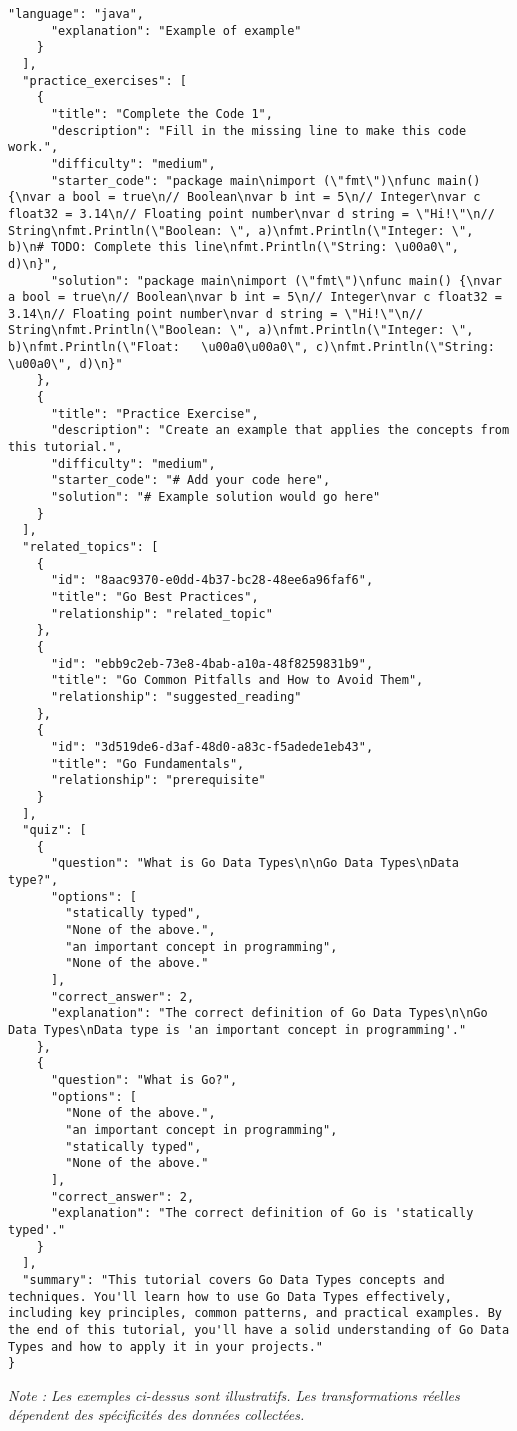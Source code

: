 \documentclass[12pt, a4paper]{article}
\begin{document}
\begin{lstlisting}[style=json, caption=Extrait de données après application du script de nettoyage, label=lst:json_after]
      "language": "java",
      "explanation": "Example of example"
    }
  ],
  "practice_exercises": [
    {
      "title": "Complete the Code 1",
      "description": "Fill in the missing line to make this code work.",
      "difficulty": "medium",
      "starter_code": "package main\nimport (\"fmt\")\nfunc main() {\nvar a bool = true\n// Boolean\nvar b int = 5\n// Integer\nvar c float32 = 3.14\n// Floating point number\nvar d string = \"Hi!\"\n// String\nfmt.Println(\"Boolean: \", a)\nfmt.Println(\"Integer: \", b)\n# TODO: Complete this line\nfmt.Println(\"String: \u00a0\", d)\n}",
      "solution": "package main\nimport (\"fmt\")\nfunc main() {\nvar a bool = true\n// Boolean\nvar b int = 5\n// Integer\nvar c float32 = 3.14\n// Floating point number\nvar d string = \"Hi!\"\n// String\nfmt.Println(\"Boolean: \", a)\nfmt.Println(\"Integer: \", b)\nfmt.Println(\"Float:   \u00a0\u00a0\", c)\nfmt.Println(\"String: \u00a0\", d)\n}"
    },
    {
      "title": "Practice Exercise",
      "description": "Create an example that applies the concepts from this tutorial.",
      "difficulty": "medium",
      "starter_code": "# Add your code here",
      "solution": "# Example solution would go here"
    }
  ],
  "related_topics": [
    {
      "id": "8aac9370-e0dd-4b37-bc28-48ee6a96faf6",
      "title": "Go Best Practices",
      "relationship": "related_topic"
    },
    {
      "id": "ebb9c2eb-73e8-4bab-a10a-48f8259831b9",
      "title": "Go Common Pitfalls and How to Avoid Them",
      "relationship": "suggested_reading"
    },
    {
      "id": "3d519de6-d3af-48d0-a83c-f5adede1eb43",
      "title": "Go Fundamentals",
      "relationship": "prerequisite"
    }
  ],
  "quiz": [
    {
      "question": "What is Go Data Types\n\nGo Data Types\nData type?",
      "options": [
        "statically typed",
        "None of the above.",
        "an important concept in programming",
        "None of the above."
      ],
      "correct_answer": 2,
      "explanation": "The correct definition of Go Data Types\n\nGo Data Types\nData type is 'an important concept in programming'."
    },
    {
      "question": "What is Go?",
      "options": [
        "None of the above.",
        "an important concept in programming",
        "statically typed",
        "None of the above."
      ],
      "correct_answer": 2,
      "explanation": "The correct definition of Go is 'statically typed'."
    }
  ],
  "summary": "This tutorial covers Go Data Types concepts and techniques. You'll learn how to use Go Data Types effectively, including key principles, common patterns, and practical examples. By the end of this tutorial, you'll have a solid understanding of Go Data Types and how to apply it in your projects."
}
\end{lstlisting}
\textit{Note : Les exemples ci-dessus sont illustratifs. Les transformations réelles dépendent des spécificités des données collectées.}
\end{document}
